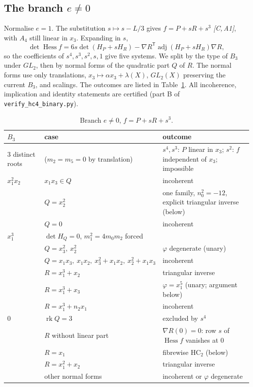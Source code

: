 \documentclass[11pt]{article}
\theoremstyle{remark}
\newcommand{\Hess}{\operatorname{Hess}}
\newcommand{\adj}{\operatorname{adj}}
\newcommand{\HC}{\mathrm{HC}}
\newcommand{\cert}[1]{\emph{[C,\,#1]}}
\begin{document}
\subsection{The branch $e\ne0$}
Normalise $e=1$. The substitution $s\mapsto s-L/3$ gives $f=P+sR+s^3$ \cert{A1}, with $A_4$ still linear in $x_3$. Expanding in $s$,
\[\det\Hess f=6s\det(H_P+sH_R)-\nabla R^{\mathsf T}\adj(H_P+sH_R)\nabla R,\]
so the coefficients of $s^4,s^3,s^2,s,1$ give five systems. We split by the type of $B_3$ under $GL_2$, then by normal forms of the quadratic part $Q$ of $R$. The normal forms use only translations, $x_3\mapsto\alpha x_3+\lambda(X)$, $GL_2(X)$ preserving the current $B_3$, and scalings. The outcomes are listed in Table~\ref{tab:e1}. All incoherence, implication and identity statements are certified (part B of \texttt{verify\_hc4\_binary.py}).

\begin{table}[h]\centering\small
\begin{tabular}{@{}lll@{}}\toprule
$B_3$ & case & outcome\\\midrule
3 distinct roots & ($m_2=m_5=0$ by translation) & $s^4,s^3$: $P$ linear in $x_3$; $s^2$: $f$ independent of $x_3$; impossible\\
$x_1^2x_2$ & $x_1x_3\in Q$ & incoherent\\
 & $Q=x_2^2$ & one family, $n_0^2=-12$, explicit triangular inverse (below)\\
 & $Q=0$ & incoherent\\
$x_1^3$ & $\det H_Q=0$, $m_1^2=4m_0m_2$ forced & \\
 & $Q=x_3^2,\ x_2^2$ & $\varphi$ degenerate (unary)\\
 & $Q=x_1x_3,\ x_1x_2,\ x_3^2+x_1x_2,\ x_2^2+x_1x_3$ & incoherent\\
 & $R=x_1^3+x_2$ & triangular inverse\\
 & $R=x_1^3+x_3$ & $\varphi=x_1^5$ (unary; argument below)\\
 & $R=x_1^3+n_2x_1$ & incoherent\\
$0$ & $\operatorname{rk}Q=3$ & excluded by $s^4$\\
 & $R$ without linear part & $\nabla R(0)=0$: row $s$ of $\Hess f$ vanishes at $0$\\
 & $R=x_1$ & fibrewise $\HC_2$ (below)\\
 & $R=x_1^2+x_2$ & triangular inverse\\
 & other normal forms & incoherent or $\varphi$ degenerate\\\bottomrule
\end{tabular}
\caption{Branch $e\ne0$, $f=P+sR+s^3$.}\label{tab:e1}
\end{table}
\end{document}
